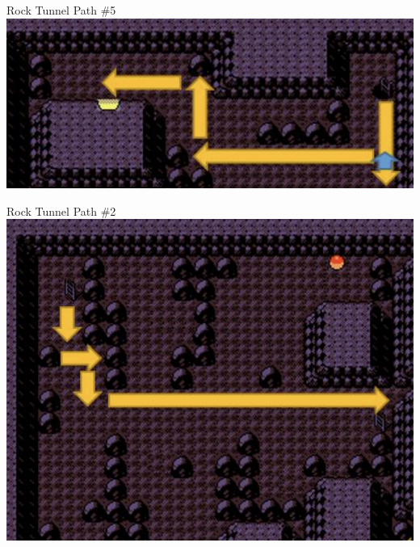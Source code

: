 \begin{paracol}{2}
\begin{story}{Rock Tunnel Path \#5}
	\varwb
	\includegraphics[scale=0.75]{../Graphics/23. Rock Tunnel 5.png}
	\varwe
\end{story}

\switchcolumn
\vspace{4.9cm}
\begin{story}{Rock Tunnel Path \#2}
	\varwb
	\includegraphics[scale=0.5]{../Graphics/20. Rock Tunnel 2.png}
	\varwe
\end{story}


\end{paracol}
